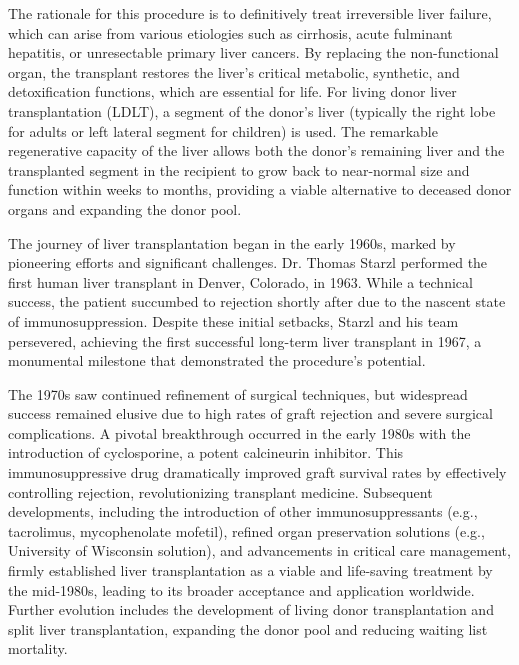 The rationale for this procedure is to definitively treat irreversible liver failure, which can arise from various etiologies such as cirrhosis, acute fulminant hepatitis, or unresectable primary liver cancers. By replacing the non-functional organ, the transplant restores the liver's critical metabolic, synthetic, and detoxification functions, which are essential for life. For living donor liver transplantation (LDLT), a segment of the donor's liver (typically the right lobe for adults or left lateral segment for children) is used. The remarkable regenerative capacity of the liver allows both the donor's remaining liver and the transplanted segment in the recipient to grow back to near-normal size and function within weeks to months, providing a viable alternative to deceased donor organs and expanding the donor pool.

The journey of liver transplantation began in the early 1960s, marked by pioneering efforts and significant challenges. Dr. Thomas Starzl performed the first human liver transplant in Denver, Colorado, in 1963. While a technical success, the patient succumbed to rejection shortly after due to the nascent state of immunosuppression. Despite these initial setbacks, Starzl and his team persevered, achieving the first successful long-term liver transplant in 1967, a monumental milestone that demonstrated the procedure's potential.

The 1970s saw continued refinement of surgical techniques, but widespread success remained elusive due to high rates of graft rejection and severe surgical complications. A pivotal breakthrough occurred in the early 1980s with the introduction of cyclosporine, a potent calcineurin inhibitor. This immunosuppressive drug dramatically improved graft survival rates by effectively controlling rejection, revolutionizing transplant medicine. Subsequent developments, including the introduction of other immunosuppressants (e.g., tacrolimus, mycophenolate mofetil), refined organ preservation solutions (e.g., University of Wisconsin solution), and advancements in critical care management, firmly established liver transplantation as a viable and life-saving treatment by the mid-1980s, leading to its broader acceptance and application worldwide. Further evolution includes the development of living donor transplantation and split liver transplantation, expanding the donor pool and reducing waiting list mortality.

